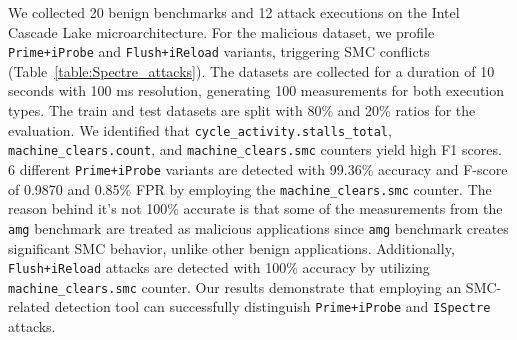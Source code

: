 We collected 20 benign benchmarks and 12 attack executions on the Intel Cascade Lake microarchitecture. For the malicious dataset, we profile \texttt{Prime+iProbe} and \texttt{Flush+iReload} variants, triggering SMC conflicts (Table~\ref{table:Spectre_attacks}). The datasets are collected for a duration of 10 seconds with 100 ms resolution, generating 100 measurements for both execution types. 
The train and test datasets are split with 80\% and 20\% ratios for the evaluation. We identified that \texttt{cycle\_\allowbreak activity.\allowbreak stalls\_\allowbreak total}, \texttt{machine\_clears.count}, and \texttt{machine\_\allowbreak clears.\allowbreak smc} counters yield high F1 scores. 6 different \texttt{Prime+iProbe} variants are detected with 99.36\% accuracy and F-score of 0.9870 and 0.85\% FPR by employing the \texttt{machine\_clears.smc} counter.
The reason behind it's not 100\% accurate is that some of the measurements from the \texttt{amg} benchmark are treated as malicious applications since \texttt{amg} benchmark creates significant SMC behavior, unlike other benign applications. Additionally, \texttt{Flush+iReload} attacks are detected with 100\% accuracy by utilizing \texttt{machine\_clears.smc} counter. Our results demonstrate that employing an SMC-related detection tool can successfully distinguish \texttt{Prime+iProbe} and \texttt{ISpectre} attacks. 

